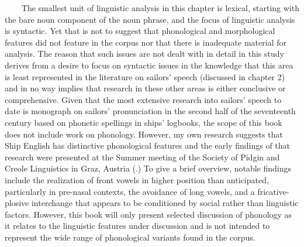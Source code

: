 \textbf{~~~}   The smallest unit of linguistic analysis in this chapter is lexical, starting with the bare noun component of the noun phrase, and the focus of linguistic analysis is syntactic. Yet that is not to suggest that phonological and morphological features did not feature in the corpus nor that there is inadequate material for analysis. The reason that such issues are not dealt with in detail in this study derives from a desire to focus on syntactic issues in the knowledge that this area is least represented in the literature on sailors’ speech (discussed in chapter 2) and in no way implies that research in these other areas is either conclusive or comprehensive. Given that the most extensive research into sailors’ speech to date is  monograph on sailors’ pronunciation in the second half of the seventeenth century based on phonetic spellings in ships’ logbooks, the scope of this book does not include work on phonology. However, my own research suggests that Ship English has distinctive phonological features and the early findings of that research were presented at the Summer meeting of the Society of Pidgin and Creole Linguistics in Graz, Austria (\citealt{Delgado2015}.) To give a brief overview, notable findings include the realization of front vowels in higher position than anticipated, particularly in pre-nasal contexts, the avoidance of long vowels, and a fricative-plosive interchange that appears to be conditioned by social rather than linguistic factors. However, this book will only present selected discussion of phonology as it relates to the linguistic features under discussion and is not intended to represent the wide range of phonological variants found in the corpus. 

